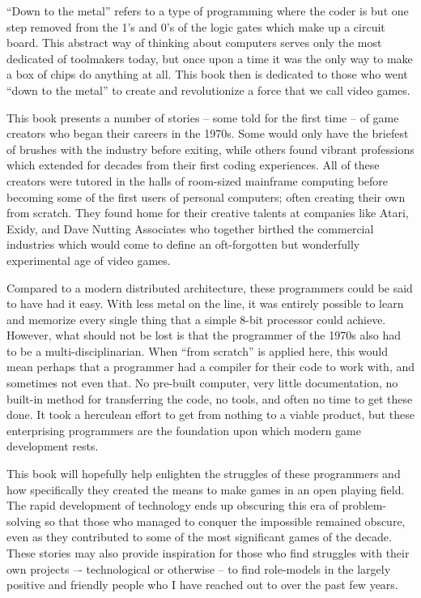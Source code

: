 \quad “Down to the metal” refers to a type of programming where the coder is but one step removed from the 1’s and 0’s of the logic gates which make up a circuit board. This abstract way of thinking about computers serves only the most dedicated of toolmakers today, but once upon a time it was the only way to make a box of chips do anything at all. This book then is dedicated to those who went “down to the metal” to create and revolutionize a force that we call video games.

This book presents a number of stories – some told for the first time – of game creators who began their careers in the 1970s. Some would only have the briefest of brushes with the industry before exiting, while others found vibrant professions which extended for decades from their first coding experiences. All of these creators were tutored in the halls of room-sized mainframe computing before becoming some of the first users of personal computers; often creating their own from scratch. They found home for their creative talents at companies like Atari, Exidy, and Dave Nutting Associates who together birthed the commercial industries which would come to define an oft-forgotten but wonderfully experimental age of video games.

Compared to a modern distributed architecture, these programmers could be said to have had it easy. With less metal on the line, it was entirely possible to learn and memorize every single thing that a simple 8-bit processor could achieve. However, what should not be lost is that the programmer of the 1970s also had to be a multi-disciplinarian. When “from scratch” is applied here, this would mean perhaps that a programmer had a compiler for their code to work with, and sometimes not even that. No pre-built computer, very little documentation, no built-in method for transferring the code, no tools, and often no time to get these done. It took a herculean effort to get from nothing to a viable product, but these enterprising programmers are the foundation upon which modern game development rests.

This book will hopefully help enlighten the struggles of these programmers and how specifically they created the means to make games in an open playing field. The rapid development of technology ends up obscuring this era of problem-solving so that those who managed to conquer the impossible remained obscure, even as they contributed to some of the most significant games of the decade. These stories may also provide inspiration for those who find struggles with their own projects –- technological or otherwise -- to find role-models in the largely positive and friendly people who I have reached out to over the past few years.

